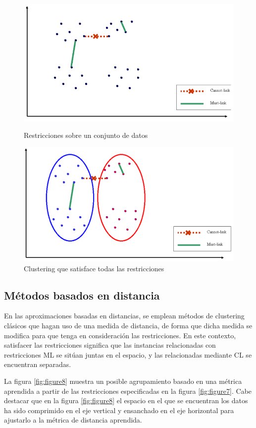 \begin{figure}[bth]
	\myfloatalign
	{\includegraphics[width=.6\linewidth]{imagenes/c3/InputInstancesAndConst1}
	\caption{Restricciones sobre un conjunto de datos \cite{Survey:2007}} \label{fig:figure5}
	}
	{\includegraphics[width=.6\linewidth]{imagenes/c3/ClusteringSatAll}
	\caption{Clustering que satisface todas las restricciones \cite{Survey:2007}} \label{fig:figure6}
	}
\end{figure}

\subsection{Métodos basados en distancia}

En las aproximaciones basadas en distancias, se emplean métodos de clustering clásicos que hagan uso de una medida de distancia, de forma que dicha medida se modifica para que tenga en consideración las restricciones. En este contexto, satisfacer las restricciones significa que las instancias relacionadas con restricciones \acf{ML} se sitúan juntas en el espacio, y las relacionadas mediante \acf{CL} se encuentran separadas.

La figura \ref{fig:figure8} muestra un posible agrupamiento basado en una métrica aprendida a partir de las restricciones especificadas en la figura \ref{fig:figure7}. Cabe destacar que en la figura \ref{fig:figure8} el espacio en el que se encuentran los datos ha sido comprimido en el eje vertical y ensanchado en el eje horizontal para ajustarlo a la métrica de distancia aprendida.

